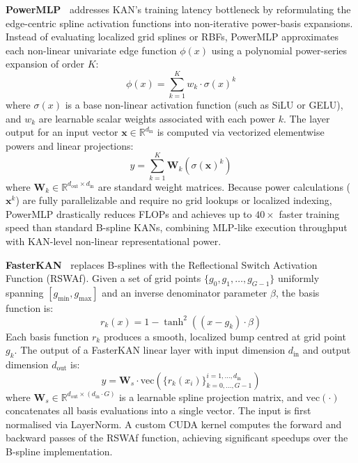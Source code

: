 \documentclass[a4paper]{report}
\begin{document}
\textbf{PowerMLP~\cite{qiu2024powermlp}} addresses KAN's training latency bottleneck by reformulating the edge-centric spline activation functions into non-iterative power-basis expansions. Instead of evaluating localized grid splines or RBFs, PowerMLP approximates each non-linear univariate edge function $\phi(x)$ using a polynomial power-series expansion of order $K$:
\begin{equation}
    \phi(x) = \sum_{k=1}^{K} w_k \cdot \sigma(x)^k
\end{equation}
where $\sigma(x)$ is a base non-linear activation function (such as SiLU or GELU), and $w_k$ are learnable scalar weights associated with each power $k$. The layer output for an input vector $\mathbf{x} \in \mathbb{R}^{d_{\text{in}}}$ is computed via vectorized elementwise powers and linear projections:
\begin{equation}
    y = \sum_{k=1}^{K} \mathbf{W}_k \left( \sigma(\mathbf{x})^k \right)
\end{equation}
where $\mathbf{W}_k \in \mathbb{R}^{d_{\text{out}} \times d_{\text{in}}}$ are standard weight matrices. Because power calculations ($\mathbf{x}^k$) are fully parallelizable and require no grid lookups or localized indexing, PowerMLP drastically reduces FLOPs and achieves up to $40\times$ faster training speed than standard B-spline KANs, combining MLP-like execution throughput with KAN-level non-linear representational power.

\textbf{FasterKAN~\cite{fasterkan2024}} replaces B-splines with the Reflectional Switch Activation Function (RSWAf). Given a set of grid points $\{g_0, g_1, \dots, g_{G-1}\}$ uniformly spanning $[g_{\min}, g_{\max}]$ and an inverse denominator parameter $\beta$, the basis function is:
\begin{equation}
    r_k(x) = 1 - \tanh^2\left((x - g_k) \cdot \beta\right)
\end{equation}
Each basis function $r_k$ produces a smooth, localized bump centred at grid point $g_k$. The output of a FasterKAN linear layer with input dimension $d_{\text{in}}$ and output dimension $d_{\text{out}}$ is:
\begin{equation}
    y = \mathbf{W}_s \cdot \text{vec}\left(\{r_k(x_i)\}_{k=0,\dots,G-1}^{i=1,\dots,d_{\text{in}}}\right)
\end{equation}
where $\mathbf{W}_s \in \mathbb{R}^{d_{\text{out}} \times (d_{\text{in}} \cdot G)}$ is a learnable spline projection matrix, and $\text{vec}(\cdot)$ concatenates all basis evaluations into a single vector. The input is first normalised via LayerNorm. A custom CUDA kernel computes the forward and backward passes of the RSWAf function, achieving significant speedups over the B-spline implementation.
\end{document}
